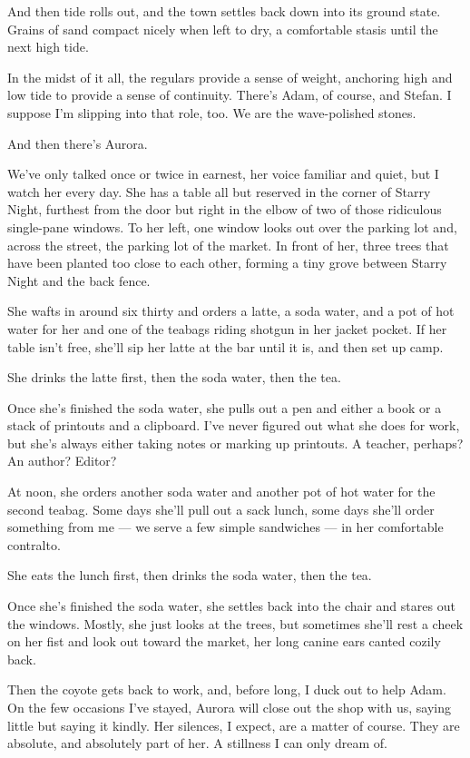 And then tide rolls out, and the town settles back down into its ground state. Grains of sand compact nicely when left to dry, a comfortable stasis until the next high tide.

In the midst of it all, the regulars provide a sense of weight, anchoring high and low tide to provide a sense of continuity. There's Adam, of course, and Stefan. I suppose I'm slipping into that role, too. We are the wave-polished stones.

And then there's Aurora.

We've only talked once or twice in earnest, her voice familiar and quiet, but I watch her every day. She has a table all but reserved in the corner of Starry Night, furthest from the door but right in the elbow of two of those ridiculous single-pane windows. To her left, one window looks out over the parking lot and, across the street, the parking lot of the market. In front of her, three trees that have been planted too close to each other, forming a tiny grove between Starry Night and the back fence.

She wafts in around six thirty and orders a latte, a soda water, and a pot of hot water for her and one of the teabags riding shotgun in her jacket pocket. If her table isn't free, she'll sip her latte at the bar until it is, and then set up camp.

She drinks the latte first, then the soda water, then the tea.

Once she's finished the soda water, she pulls out a pen and either a book or a stack of printouts and a clipboard. I've never figured out what she does for work, but she's always either taking notes or marking up printouts. A teacher, perhaps? An author? Editor?

At noon, she orders another soda water and another pot of hot water for the second teabag. Some days she'll pull out a sack lunch, some days she'll order something from me --- we serve a few simple sandwiches --- in her comfortable contralto.

She eats the lunch first, then drinks the soda water, then the tea.

Once she's finished the soda water, she settles back into the chair and stares out the windows. Mostly, she just looks at the trees, but sometimes she'll rest a cheek on her fist and look out toward the market, her long canine ears canted cozily back.

Then the coyote gets back to work, and, before long, I duck out to help Adam. On the few occasions I've stayed, Aurora will close out the shop with us, saying little but saying it kindly. Her silences, I expect, are a matter of course. They are absolute, and absolutely part of her. A stillness I can only dream of.

